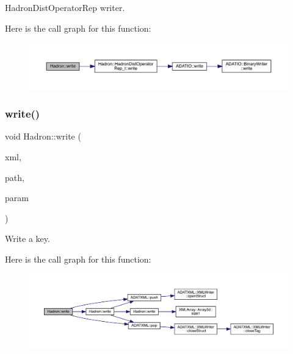 Hadron\+Dist\+Operator\+Rep writer. 

Here is the call graph for this function\+:\nopagebreak
\begin{figure}[H]
\begin{center}
\leavevmode
\includegraphics[width=350pt]{d1/daf/namespaceHadron_a9edaeb80eb507096c7529be211efa667_cgraph}
\end{center}
\end{figure}
\mbox{\label{namespaceHadron_aa1f03b8b2d78349da848f9a9bcf19e33}} 
\subsubsection{\texorpdfstring{write()}{write()}\hspace{0.1cm}{\footnotesize\ttfamily [92/95]}}
{\footnotesize\ttfamily void Hadron\+::write (\begin{DoxyParamCaption}\item[{\mbox{\hyperlink{classADATXML_1_1XMLWriter}{X\+M\+L\+Writer}} \&}]{xml,  }\item[{const std\+::string \&}]{path,  }\item[{const \mbox{\hyperlink{structHadron_1_1SingleHadronQuarkFlavor__t}{Single\+Hadron\+Quark\+Flavor\+\_\+t}} \&}]{param }\end{DoxyParamCaption})}



Write a key. 

Here is the call graph for this function\+:\nopagebreak
\begin{figure}[H]
\begin{center}
\leavevmode
\includegraphics[width=350pt]{d1/daf/namespaceHadron_aa1f03b8b2d78349da848f9a9bcf19e33_cgraph}
\end{center}
\end{figure}
\mbox{\label{namespaceHadron_a2994f8fc2ad609574b948b8671232dd8}} 
